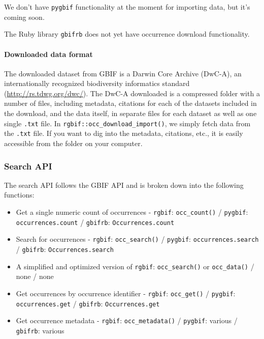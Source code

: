 \documentclass[author-year, review, 11pt]{components/elsarticle} %
\def\tightlist{}
\begin{document}
We don't have \texttt{pygbif} functionality at the moment for importing
data, but it's coming soon.

The Ruby library \texttt{gbifrb} does not yet have occurrence download
functionality.

\paragraph{Downloaded data format}\label{downloaded-data-format}

The downloaded dataset from GBIF is a Darwin Core Archive (DwC-A), an
internationally recognized biodiversity informatics standard
(\url{http://rs.tdwg.org/dwc/}). The DwC-A downloaded is a compressed
folder with a number of files, including metadata, citations for each of
the datasets included in the download, and the data itself, in separate
files for each dataset as well as one single \texttt{.txt} file. In
\texttt{rgbif::occ\_download\_import()}, we simply fetch data from the
\texttt{.txt} file. If you want to dig into the metadata, citations,
etc., it is easily accessible from the folder on your computer.

\subsubsection{Search API}\label{search-api}

The search API follows the GBIF API and is broken down into the
following functions:

\begin{itemize}
\tightlist
\item
  Get a single numeric count of occurrences - \texttt{rgbif}:
  \texttt{occ\_count()} / \texttt{pygbif}: \texttt{occurrences.count} /
  \texttt{gbifrb}: \texttt{Occurrences.count}
\item
  Search for occurrences - \texttt{rgbif}: \texttt{occ\_search()} /
  \texttt{pygbif}: \texttt{occurrences.search} / \texttt{gbifrb}:
  \texttt{Occurrences.search}
\item
  A simplified and optimized version of \texttt{rgbif}:
  \texttt{occ\_search()} or \texttt{occ\_data()} / none / none
\item
  Get occurrences by occurrence identifier - \texttt{rgbif}:
  \texttt{occ\_get()} / \texttt{pygbif}: \texttt{occurrences.get} /
  \texttt{gbifrb}: \texttt{Occurrences.get}
\item
  Get occurrence metadata - \texttt{rgbif}: \texttt{occ\_metadata()} /
  \texttt{pygbif}: various / \texttt{gbifrb}: various
\end{itemize}
\end{document}
